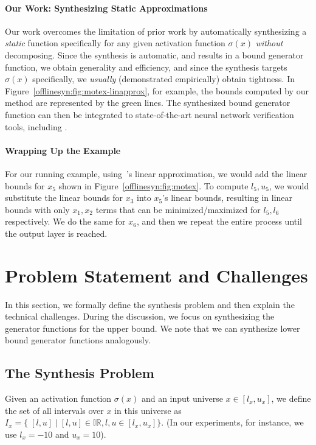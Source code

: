 \paragraph{Our Work: Synthesizing Static Approximations} Our work overcomes the
limitation of prior work by automatically synthesizing a \textit{static}
function specifically for any given activation function $ \sigma(x) $
\textit{without} decomposing. Since the
synthesis is automatic, and results in a bound generator function, we obtain generality
and efficiency, and since the synthesis targets $ \sigma(x) $ specifically, we
\textit{usually} (demonstrated empirically) obtain tightness.
%
In Figure~\ref{offlinesyn:fig:motex-linapprox}, for example, the bounds computed
by our method are represented by the green lines.
%
The synthesized bound generator function can then be integrated
to state-of-the-art neural network verification tools, including \autolipra{}.

\paragraph{Wrapping Up the Example}
For our running example, using~\autolipra{}'s linear approximation,
we would add the linear bounds for $ x_5 $ shown in
Figure~\ref{offlinesyn:fig:motex}. To
compute $ l_5, u_5 $, we would substitute the linear bounds for $ x_3 $ into $
x_5 $'s linear bounds, resulting in linear bounds with only $ x_1, x_2 $ terms
that can be minimized/maximized for $ l_5, l_6 $ respectively. We do the same
for $ x_6 $, and then we repeat the entire process until the output layer is
reached.

\section{Problem Statement and Challenges}

In this section, we formally define the synthesis problem and then explain the
technical challenges.
%
During the discussion, we focus on synthesizing the generator
functions for the upper bound. We note that we can synthesize lower bound
generator functions analogously.
%

\subsection{The Synthesis Problem}
\label{offlinesyn:sec:synthesis-problem}

Given an activation function $ \sigma(x) $ and an input universe $ x
\in [l_x, u_x] $, we define the set of all intervals over $ x $ in this universe
as $ I_x = \{ \; [l, u] \;|\; [l, u] \in \mathbb{IR}, l, u \in [l_x, u_x] \}$.
(In our experiments, for instance, we use $ l_x = -10$ and $u_x = 10 $).


